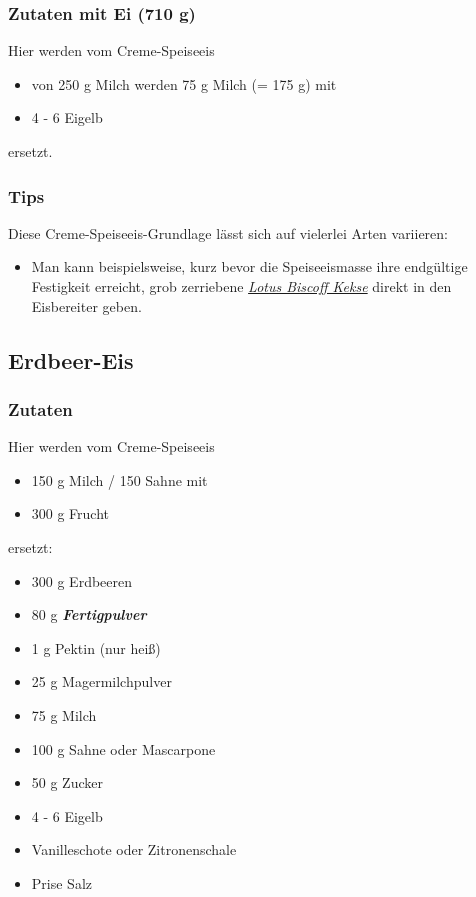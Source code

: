 \documentclass[12pt]{article}
\begin{document}
\subsubsection {Zutaten mit Ei (710 g)}

Hier werden vom Creme-Speiseeis 
\begin{itemize}
  \item von 250 g Milch werden 75 g Milch (= 175 g) mit
  \item 4 - 6 Eigelb
\end{itemize}
ersetzt.


\subsubsection {Tips}
	Diese Creme-Speiseeis-Grundlage lässt sich auf vielerlei Arten variieren: 
	\begin{itemize}
  		\item Man kann beispielsweise, kurz bevor die Speiseeismasse ihre endgültige Festigkeit erreicht, grob zerriebene  \href{https://www.lotusbiscoff.com/de-de}{\textit{Lotus Biscoff Kekse}} direkt in den Eisbereiter geben.
	\end{itemize}


\pagebreak

\subsection{Erdbeer-Eis}
\subsubsection {Zutaten}
	Hier werden vom Creme-Speiseeis 
	\begin{itemize}
	  \item 150 g Milch / 150 Sahne mit
	  \item 300 g Frucht
	\end{itemize}
	ersetzt:

\begin{itemize}
 	\item 300 g Erdbeeren
\end{itemize}
\begin{itemize}
	\item 80 g \textbf{\textit{Fertigpulver}}
  	\item 1 g Pektin (nur heiß)
  	\item 25 g Magermilchpulver
\end{itemize}
\begin{itemize}
  	\item 75 g Milch 
  	\item 100 g Sahne oder Mascarpone
  	\item 50 g Zucker
  	\item 4 - 6 Eigelb
  	\item Vanilleschote oder Zitronenschale
  	\item Prise Salz
\end{itemize}
\end{document}
